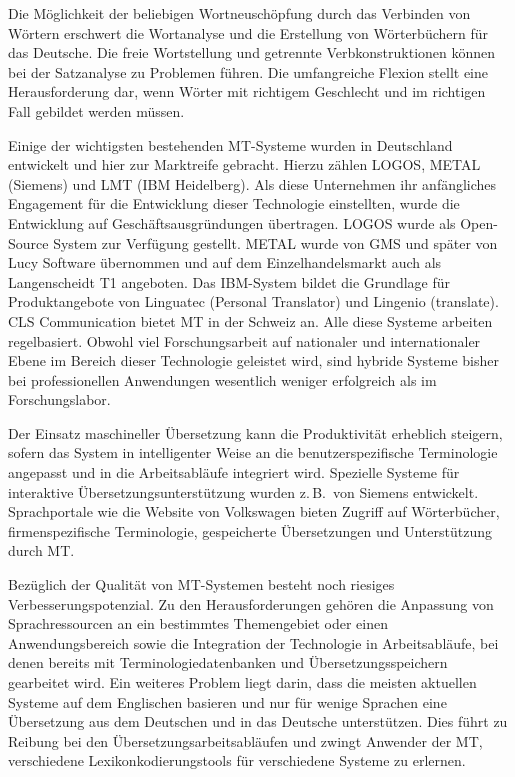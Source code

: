 \documentclass[]{../../metanetpaper}
\begin{document}
\begin{multicols}{2}
Die Möglichkeit der beliebigen Wortneuschöpfung durch das Verbinden von Wörtern erschwert die Wortanalyse und die Erstellung von Wörterbüchern für das Deutsche. Die freie Wortstellung und getrennte Verbkonstruktionen können bei der Satzanalyse zu Problemen führen. Die umfangreiche Flexion stellt eine Herausforderung dar, wenn Wörter mit richtigem Geschlecht und im richtigen Fall gebildet werden müssen. 


Einige der wichtigsten bestehenden MT-Systeme wurden in Deutschland entwickelt und hier zur Marktreife gebracht. Hierzu zählen LOGOS, METAL (Siemens) und LMT (IBM Heidelberg). Als diese Unternehmen ihr anfängliches Engagement für die Entwicklung dieser Technologie einstellten, wurde die Entwicklung auf Geschäftsausgründungen übertragen. LOGOS wurde als Open-Source System zur Verfügung gestellt. METAL wurde von GMS und später von Lucy Software übernommen und auf dem Einzelhandelsmarkt auch als Langenscheidt T1 angeboten. Das IBM-System bildet die Grundlage für Produktangebote von Linguatec (Personal Translator) und Lingenio (translate). CLS Communication bietet MT in der Schweiz an. Alle diese Systeme arbeiten regelbasiert. Obwohl viel Forschungsarbeit auf nationaler und internationaler Ebene im Bereich dieser Technologie geleistet wird, sind hybride Systeme bisher bei professionellen Anwendungen wesentlich weniger erfolgreich als im Forschungslabor. 

Der Einsatz maschineller Übersetzung kann die Produktivität erheblich steigern, sofern das System in intelligenter Weise an die benutzerspezifische Terminologie angepasst und in die Arbeitsabläufe integriert wird. Spezielle Systeme für interaktive Übersetzungsunterstützung wurden z.\,B.~von Siemens entwickelt. Sprachportale wie die Website von Volkswagen bieten Zugriff auf Wörterbücher, firmenspezifische Terminologie, gespeicherte Übersetzungen und Unterstützung durch MT.

Bezüglich der Qualität von MT-Systemen besteht noch riesiges Verbesserungspotenzial. Zu den Herausforderungen gehören die Anpassung von Sprachressourcen an ein bestimmtes Themengebiet oder einen Anwendungsbereich sowie die Integration der Technologie in Arbeitsabläufe, bei denen bereits mit Terminologiedatenbanken und Übersetzungsspeichern gearbeitet wird. Ein weiteres Problem liegt darin, dass die meisten aktuellen Systeme auf dem Englischen basieren und nur für wenige Sprachen eine Übersetzung aus dem Deutschen und in das Deutsche unterstützen. Dies führt zu Reibung bei den Übersetzungsarbeitsabläufen und zwingt Anwender der MT, verschiedene Lexikonkodierungstools für verschiedene Systeme zu erlernen.


\end{multicols}
\end{document}
